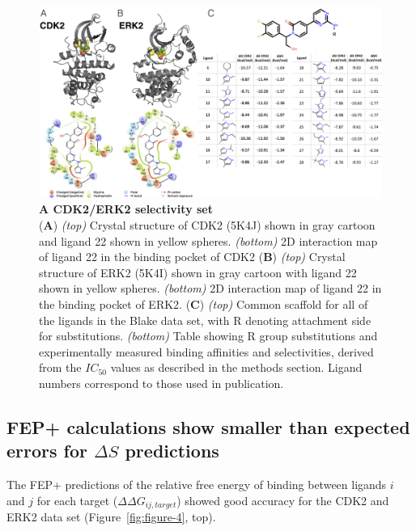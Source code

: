 \documentclass[phd,tocprelim]{cornell}
\begin{document}
\begin{landscape}
\begin{figure}[p]
\centering
\includegraphics[width=1.0\linewidth]{figures/figure3.png}
\caption[A CDK2/ERK2 selectivity set]{
{\bf A CDK2/ERK2 selectivity set}\\
({\bf A})  \emph{(top)} Crystal structure of CDK2 (5K4J) shown in gray cartoon and ligand 22 shown in yellow spheres. \emph{(bottom)} 2D interaction map of ligand 22 in the binding pocket of CDK2
({\bf B}) \emph{(top)} Crystal structure of ERK2 (5K4I) shown in gray cartoon with ligand 22 shown in yellow spheres. \emph{(bottom)} 2D interaction map of ligand 22 in the binding pocket of ERK2.
({\bf C}) \emph{(top)} Common scaffold for all of the ligands in the Blake data set, with R denoting attachment side for substitutions. \emph{(bottom)} Table showing R group substitutions and experimentally measured binding affinities and selectivities, derived from the $IC_{50}$ values as described in the methods section. Ligand numbers correspond to those used in publication. 
}
\label{fig:figure-3}
\end{figure}
\end{landscape}

\subsection{FEP+ calculations show smaller than expected errors for $\Delta S$ predictions}
The FEP+ predictions of the relative free energy of binding between ligands $i$ and $j$ for each target ($\Delta \Delta G_{ij, target}$) showed good accuracy for the CDK2 and ERK2 data set (Figure~\ref{fig:figure-4}, top). 
\end{document}
